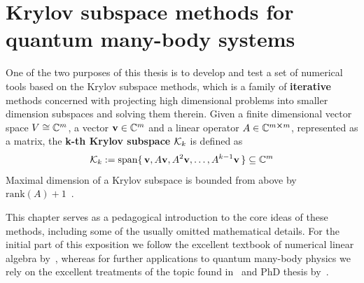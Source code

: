 
\chapter{Krylov subspace methods for quantum many-body systems\label{chap:krylov}}
\thispagestyle{chapterBeginStyle}

One of the two purposes of this thesis is to develop and test a set of numerical tools based on the Krylov subspace methods,
which is a family of \textbf{iterative} methods concerned with projecting high dimensional problems into smaller dimension subspaces
and solving them therein. Given a finite dimensional vector space \(V \cong \mathbb{C}^m \), a vector \(\vectorbold{v}\in \CC^m\) and
a linear operator \(A\in\mathbb{C}^{m\cross m}\), represented as a matrix, the \textbf{k-th Krylov subspace} \(\mathcal{K}_{k}\) is defined as 
\begin{equation}
		\K{k} := \mathrm{span}\{\,\vectorbold{v}, A\vectorbold{v}, A^2\vectorbold{v},\ldots,A^{k-1}\vectorbold{v} \,\} \subseteq \CC^m
	\label{def:krylov}
\end{equation}
Maximal dimension of a Krylov subspace is bounded from above by \(\mathrm{rank}(A) + 1\)~\autocite{Simoncini2015}.

This chapter serves as a
pedagogical introduction to the core ideas of these methods, including some of the usually omitted mathematical details.
For the initial part of this exposition we follow the excellent textbook of numerical linear algebra by~\textcite{Trefethen1997},
whereas for further applications to quantum many-body physics we rely on the excellent treatments of the topic
found in~\textcite{Sandvik2010} and PhD thesis by~\textcite{Crivelli2016}.

